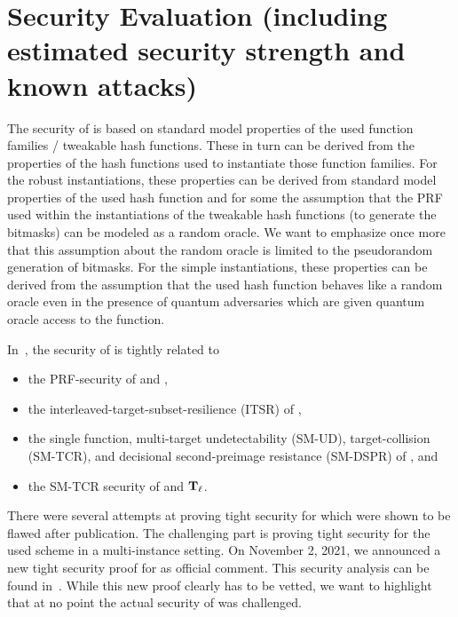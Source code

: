 \section{Security Evaluation (including estimated security strength and known attacks)}
\label{sec:security}
The security of \spx is based on standard model properties of the used function
families / tweakable hash functions. These in turn can be derived from the properties of the hash functions
used to instantiate those function families. For the robust instantiations, these
properties can be derived from standard model properties of the used hash
function and for some the assumption that the PRF used within the instantiations of the
tweakable hash functions (to generate the bitmasks) can be modeled as a random
oracle. We want to emphasize once more that this assumption about the random oracle
is limited to the pseudorandom generation of bitmasks.
For the simple instantiations, these properties can be derived from the
assumption that the used hash function behaves like a random oracle even
in the presence of quantum adversaries which are given quantum oracle access
to the function.

In~\cite{NewProof}, the security of \spx is tightly related to
\begin{itemize}
 \item the PRF-security of \sphincsPRF and \sphincsPRFmsg,
 \item the interleaved-target-subset-resilience (ITSR) of \sphincsHmsg,
 \item the single function, multi-target undetectability (SM-UD), target-collision (SM-TCR), and decisional second-preimage resistance (SM-DSPR) of \sphincsF, and
 \item the SM-TCR security of \sphincsH and $\mathbf{T}_\ell$.
\end{itemize}

%


There were several attempts at proving tight security for \spx which were shown to be flawed after publication. The challenging part is proving tight security for the used \wots scheme in a multi-instance setting. On November 2, 2021, we announced a new tight security proof for \spx as official comment. This security analysis can be found in~\cite{NewProof}. While this new proof clearly has to be vetted, we want to highlight that at no point the actual security of \spx was challenged.



